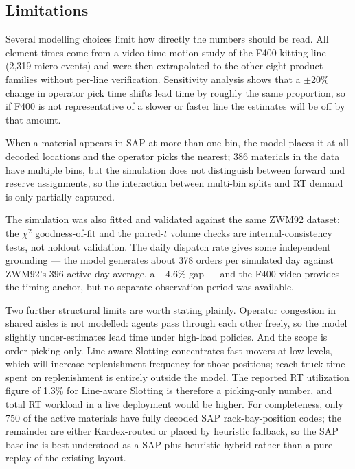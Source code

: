 \subsection*{Limitations}

Several modelling choices limit how directly the numbers should be read.
All element times come from a video time-motion study of the F400 kitting
line (2,319 micro-events) and were then extrapolated to the other eight
product families without per-line verification. Sensitivity analysis
shows that a $\pm$20\% change in operator pick time shifts lead time by
roughly the same proportion, so if F400 is not representative of a
slower or faster line the estimates will be off by that amount.

When a material appears in SAP at more than one bin, the model places it
at all decoded locations and the operator picks the nearest; 386
materials in the data have multiple bins, but the simulation does not
distinguish between forward and reserve assignments, so the interaction
between multi-bin splits and RT demand is only partially captured.

The simulation was also fitted and validated against the same ZWM92
dataset: the $\chi^2$ goodness-of-fit and the paired-$t$ volume checks
are internal-consistency tests, not holdout validation. The daily
dispatch rate gives some independent grounding --- the model generates
about 378 orders per simulated day against ZWM92's 396 active-day
average, a $-4.6$\% gap --- and the F400 video provides the timing
anchor, but no separate observation period was available.

Two further structural limits are worth stating plainly. Operator
congestion in shared aisles is not modelled: agents pass through each
other freely, so the model slightly under-estimates lead time under
high-load policies. And the scope is order picking only. Line-aware
Slotting concentrates fast movers at low levels, which will increase
replenishment frequency for those positions; reach-truck time spent on
replenishment is entirely outside the model. The reported RT utilization
figure of 1.3\% for Line-aware Slotting is therefore a picking-only
number, and total RT workload in a live deployment would be higher. For
completeness, only 750 of the active materials have fully decoded SAP
rack-bay-position codes; the remainder are either Kardex-routed or
placed by heuristic fallback, so the SAP baseline is best understood as
a SAP-plus-heuristic hybrid rather than a pure replay of the existing
layout.

